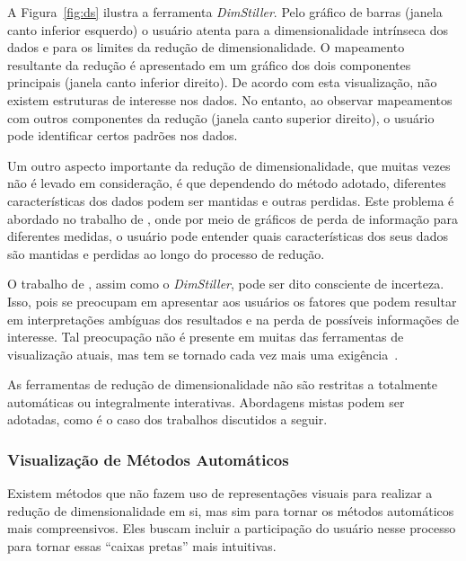 A Figura~\ref{fig:ds} ilustra a ferramenta
\emph{DimStiller}. Pelo gráfico de barras (janela canto
inferior esquerdo) o usuário atenta para a dimensionalidade
intrínseca dos dados e para os limites da redução de
dimensionalidade. O mapeamento resultante da redução é
apresentado em um gráfico dos dois componentes principais
(janela canto inferior direito). De acordo com esta
visualização, não existem estruturas de interesse nos dados.
No entanto, ao observar mapeamentos com outros componentes
da redução (janela canto superior direito), o usuário pode
identificar certos padrões nos dados.

Um outro aspecto importante da redução de dimensionalidade,
que muitas vezes não é levado em consideração, é que
dependendo do método adotado, diferentes características dos
dados podem ser mantidas e outras perdidas. Este problema é
abordado no trabalho de \citet{Johansson2009}, onde por meio
de gráficos de perda de informação para diferentes medidas,
o usuário pode entender quais características dos seus dados
são mantidas e perdidas ao longo do processo de redução. 

O trabalho de \citet{Johansson2009}, assim como o
\emph{DimStiller}, pode ser dito consciente de incerteza.
Isso, pois se preocupam em apresentar aos usuários os fatores que
podem resultar em interpretações ambíguas dos resultados e
na perda de possíveis informações de interesse. 
Tal preocupação não é presente em muitas das ferramentas de
visualização atuais, mas tem se tornado cada vez mais uma
exigência~\cite{Dill2012}.

As ferramentas de redução de dimensionalidade não são
restritas a totalmente automáticas ou integralmente
interativas. Abordagens mistas podem ser adotadas, como é o
caso dos trabalhos discutidos a seguir.

\subsubsection{Visualização de Métodos Automáticos}

Existem métodos que não fazem uso de representações
visuais para realizar a redução de dimensionalidade em si,
mas sim para tornar os métodos automáticos mais
compreensivos. Eles buscam incluir a participação do usuário
nesse processo para tornar essas ``caixas pretas'' mais
intuitivas. 

